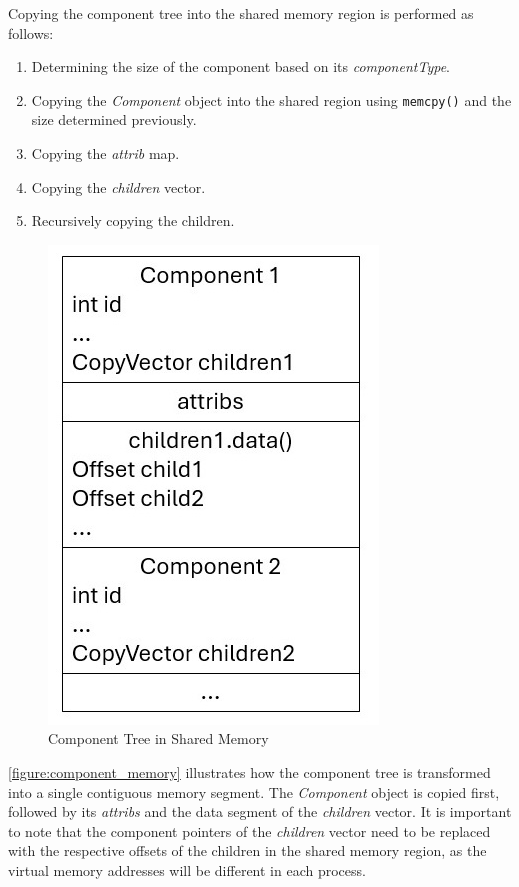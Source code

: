 Copying the component tree into the shared memory region is performed as follows:
\begin{enumerate}
    \item Determining the size of the component based on its \emph{componentType}.
    \item Copying the \emph{Component} object into the shared region using \lstinline{memcpy()} and the size determined previously.
    \item Copying the \emph{attrib} map.
    \item Copying the \emph{children} vector.
    \item Recursively copying the children.
\end{enumerate}

\begin{figure}[!ht]
    \includegraphics[scale=0.7]{images/component_memory.jpg}
    \centering
    \caption{Component Tree in Shared Memory}
    \label{figure:component_memory}
\end{figure}

\autoref{figure:component_memory} illustrates how the component tree is transformed into a single contiguous memory segment.
The \emph{Component} object is copied first, followed by its \emph{attribs} and the data segment of the \emph{children} vector.
It is important to note that the component pointers of the \emph{children} vector need to be replaced with the respective offsets of the children in the shared memory region,
as the virtual memory addresses will be different in each process.

